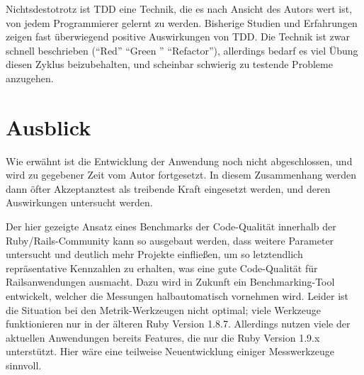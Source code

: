 Nichtsdestotrotz ist TDD eine Technik, die es nach Ansicht des Autors wert ist, von jedem Programmierer gelernt zu werden. Bisherige Studien und Erfahrungen zeigen fast überwiegend positive Auswirkungen von TDD. Die Technik ist zwar schnell beschrieben ("`Red"' "`Green "' "`Refactor"'), allerdings bedarf es viel Übung diesen Zyklus beizubehalten, und scheinbar schwierig zu testende Probleme anzugehen.

%   
%   
%     


\section{Ausblick}
Wie erwähnt ist die Entwicklung der Anwendung noch nicht abgeschlossen, und wird zu gegebener Zeit vom Autor fortgesetzt. In diesem Zusammenhang werden dann öfter Akzeptanztest als treibende Kraft eingesetzt werden, und deren Auswirkungen untersucht werden.

Der hier gezeigte Ansatz eines Benchmarks der Code-Qualität innerhalb der Ruby/Rails-Community kann so ausgebaut werden, dass weitere Parameter untersucht und deutlich mehr Projekte einfließen, um so letztendlich repräsentative Kennzahlen zu erhalten, was eine gute Code-Qualität für Railsanwendungen ausmacht. Dazu wird in Zukunft ein Benchmarking-Tool entwickelt, welcher die Messungen halbautomatisch vornehmen wird. Leider ist die Situation bei den Metrik-Werkzeugen nicht optimal; viele Werkzeuge funktionieren nur in der älteren Ruby Version 1.8.7. Allerdings nutzen viele der aktuellen Anwendungen bereits Features, die nur die Ruby Version 1.9.x unterstützt. Hier wäre eine teilweise Neuentwicklung einiger Messwerkzeuge sinnvoll.

